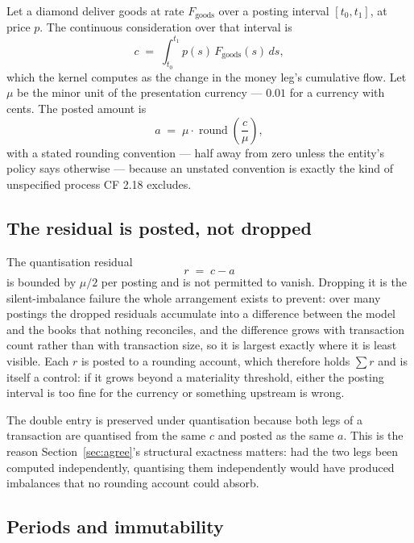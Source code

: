 \documentclass[11pt,a4paper]{article}
\begin{document}
Let a diamond deliver goods at rate $F_{\text{goods}}$ over a posting interval $[t_0, t_1]$, at price $p$. The continuous consideration over that interval is
\begin{equation}
c \;=\; \int_{t_0}^{t_1} p(s)\, F_{\text{goods}}(s)\, ds,
\end{equation}
which the kernel computes as the change in the money leg's cumulative flow. Let $\mu$ be the minor unit of the presentation currency --- $0.01$ for a currency with cents. The posted amount is
\begin{equation}
a \;=\; \mu \cdot \operatorname{round}\!\left(\frac{c}{\mu}\right),
\label{eq:quantise}
\end{equation}
with a stated rounding convention --- half away from zero unless the entity's policy says otherwise --- because an unstated convention is exactly the kind of unspecified process CF 2.18 excludes.

\subsection{The residual is posted, not dropped}

The quantisation residual
\begin{equation}
r \;=\; c - a
\end{equation}
is bounded by $\mu/2$ per posting and is not permitted to vanish. Dropping it is the silent-imbalance failure the whole arrangement exists to prevent: over many postings the dropped residuals accumulate into a difference between the model and the books that nothing reconciles, and the difference grows with transaction count rather than with transaction size, so it is largest exactly where it is least visible. Each $r$ is posted to a rounding account, which therefore holds $\sum r$ and is itself a control: if it grows beyond a materiality threshold, either the posting interval is too fine for the currency or something upstream is wrong.

The double entry is preserved under quantisation because both legs of a transaction are quantised from the same $c$ and posted as the same $a$. This is the reason Section~\ref{sec:agree}'s structural exactness matters: had the two legs been computed independently, quantising them independently would have produced imbalances that no rounding account could absorb.

\subsection{Periods and immutability}
\end{document}
